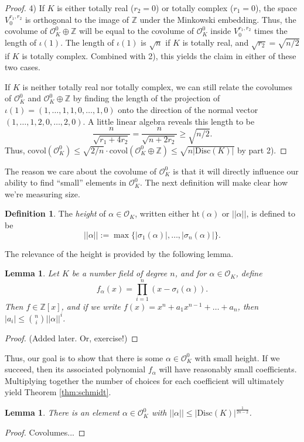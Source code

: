 \documentclass[12pt]{amsart}
\newtheorem{lemma}[theorem]{Lemma}
\theoremstyle{definition} \newtheorem*{notation}{Notation}
\theoremstyle{remark} \newtheorem*{remark}{Remark}
\theoremstyle{remark} \newtheorem*{example}{Example}
\theoremstyle{definition} \newtheorem*{definition}{Definition}
\theoremstyle{definition} \newtheorem*{question}{Question}
\numberwithin{equation}{section}
\numberwithin{theorem}{section}
\begin{document}
\begin{proof}
		4) If $K$ is either totally real ($r_2=0$) or totally complex ($r_1=0$), the space $V_0^{r_1,r_2}$ is orthogonal to the image of $\mathbb{Z}$ under the Minkowski embedding.  Thus, the covolume of $\mathcal{O}_K^0 \oplus \mathbb{Z}$ will be equal to the covolume of $\mathcal{O}_K^0$ inside $V_0^{r_1,r_2}$ times the length of $\iota(1)$.  The length of $\iota(1)$ is $\sqrt{n}$ if $K$ is totally real, and $\sqrt{r_2} = \sqrt{n/2}$ if $K$ is totally complex.  Combined with 2), this yields the claim in either of these two cases.
		
		If $K$ is neither totally real nor totally complex, we can still relate the covolumes of $\mathcal{O}_K^0$ and $\mathcal{O}_K^0 \oplus \mathbb{Z}$ by finding the length of the projection of $\iota(1) = (1,\dots,1,1,0,\dots,1,0)$ onto the direction of the normal vector $(1,\dots,1,2,0,\dots,2,0)$.  A little linear algebra reveals this length to be
			\[
				\frac{n}{\sqrt{r_1+4r_2}} = \frac{n}{\sqrt{n+2r_2}} \geq \sqrt{n/2}.
			\]
		Thus, $\mathrm{covol}(\mathcal{O}_K^0) \leq \sqrt{2/n} \cdot \mathrm{covol}(\mathcal{O}_K^0 \oplus \mathbb{Z}) \leq \sqrt{ n |\mathrm{Disc}(K)|}$ by  part 2).
	\end{proof}
	
	The reason we care about the covolume of $\mathcal{O}_K^0$ is that it will directly influence our ability to find ``small'' elements in $\mathcal{O}_K^0$.  The next definition will make clear how we're measuring size.
	
	\begin{definition}
		The \emph{height} of $\alpha \in \mathcal{O}_K$, written either $\mathrm{ht}(\alpha)$ or $||\alpha||$, is defined to be
			\[
				||\alpha|| := \max\{|\sigma_1(\alpha)|, \dots, |\sigma_n(\alpha)|\}.
			\]
	\end{definition}
	
	The relevance of the height is provided by the following lemma.
	
	\begin{lemma}
		Let $K$ be a number field of degree $n$, and for $\alpha \in \mathcal{O}_K$, define
			\[
				f_\alpha(x) = \prod_{i=1}^n (x-\sigma_i(\alpha)).
			\]
		Then $f \in \mathbb{Z}[x]$, and if we write $f(x)=x^n + a_1 x^{n-1} + \dots + a_n$, then $|a_i| \leq \binom{n}{i} || \alpha||^i$.
	\end{lemma}
	\begin{proof}
		(Added later.  Or, exercise!)
	\end{proof}

	Thus, our goal is to show that there is some $\alpha \in \mathcal{O}_K^0$ with small height.  If we succeed, then its associated polynomial $f_\alpha$ will have reasonably small coefficients.  Multiplying together the number of choices for each coefficient will ultimately yield Theorem \ref{thm:schmidt}.
	
	\begin{lemma}
		There is an element $\alpha \in \mathcal{O}_K^0$ with $||\alpha|| \leq |\mathrm{Disc}(K)|^{\frac{1}{2n-2}}$.
	\end{lemma}
	\begin{proof}
		Covolumes...
	\end{proof}

	
\end{document}
